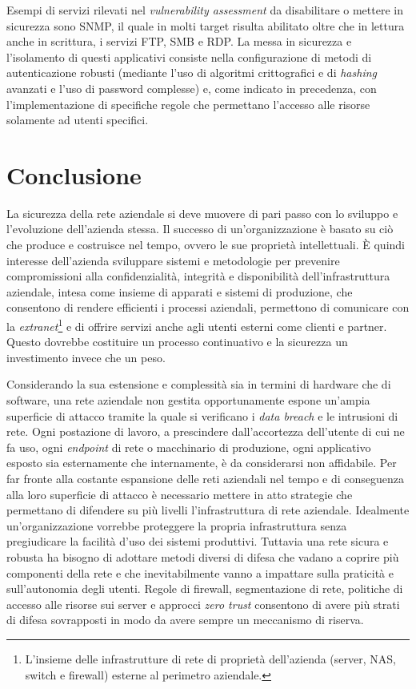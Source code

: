 \documentclass[target=bach,aauheader=]{thud}
\begin{document}
Esempi di servizi rilevati nel \textit{vulnerability assessment} da disabilitare o mettere in sicurezza sono SNMP, il quale in molti target risulta abilitato oltre che in lettura anche in scrittura, i servizi FTP, SMB e RDP. La messa in sicurezza e l'isolamento di questi applicativi consiste nella configurazione di metodi di autenticazione robusti (mediante l'uso di algoritmi crittografici e di \textit{hashing} avanzati e l'uso di password complesse) e, come indicato in precedenza, con l'implementazione di specifiche regole che permettano l'accesso alle risorse solamente ad utenti specifici.


\chapter{Conclusione}

La sicurezza della rete aziendale si deve muovere di pari passo con lo sviluppo e l'evoluzione dell'azienda stessa. Il successo di un'organizzazione è basato su ciò che produce e costruisce nel tempo, ovvero le sue proprietà intellettuali. È quindi interesse dell'azienda sviluppare sistemi e metodologie per prevenire compromissioni alla confidenzialità, integrità e disponibilità dell'infrastruttura aziendale, intesa come insieme di apparati e sistemi di produzione, che consentono di rendere efficienti i processi aziendali, permettono di comunicare con la \textit{extranet}\footnote{L'insieme delle infrastrutture di rete di proprietà dell'azienda (server, NAS, switch e firewall) esterne al perimetro aziendale.} e di offrire servizi anche agli utenti esterni come clienti e partner. Questo dovrebbe costituire un processo continuativo e la sicurezza un investimento invece che un peso.

Considerando la sua estensione e complessità sia in termini di hardware che di software, una rete aziendale non gestita opportunamente espone un'ampia superficie di attacco tramite la quale si verificano i \textit{data breach} e le intrusioni di rete. Ogni postazione di lavoro, a prescindere dall'accortezza dell'utente di cui ne fa uso, ogni \textit{endpoint} di rete o macchinario di produzione, ogni applicativo esposto sia esternamente che internamente, è da considerarsi non affidabile. Per far fronte alla costante espansione delle reti aziendali nel tempo e di conseguenza alla loro superficie di attacco è necessario mettere in atto strategie che permettano di difendere su più livelli l'infrastruttura di rete aziendale. Idealmente un'organizzazione vorrebbe proteggere la propria infrastruttura senza pregiudicare la facilità d'uso dei sistemi produttivi. Tuttavia una rete sicura e robusta ha bisogno di adottare metodi diversi di difesa che vadano a coprire più componenti della rete e che inevitabilmente vanno a impattare sulla praticità e sull'autonomia degli utenti. Regole di firewall, segmentazione di rete, politiche di accesso alle risorse sui server e approcci \textit{zero trust} consentono di avere più strati di difesa sovrapposti in modo da avere sempre un meccanismo di riserva.
\end{document}
